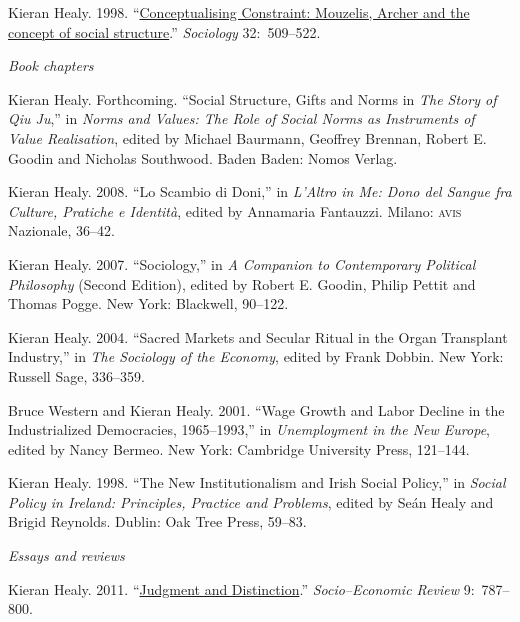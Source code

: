 \documentclass[11pt,oneside,a4paper,DIV=8]{scrartcl}
\begin{document}
Kieran Healy. 1998.  ``\href{http://www.kieranhealy.org/files/papers/constraint98.pdf}{Conceptualising Constraint: Mouzelis, Archer and the concept of
  social structure}.'' \emph{Sociology} 32:~509--522. 



\noindent\emph{Book chapters}

Kieran Healy. Forthcoming. ``Social Structure, Gifts and Norms in \emph{The Story of Qiu Ju},'' in \emph{Norms and Values: The Role of Social Norms as Instruments of Value Realisation}, edited by Michael Baurmann, Geoffrey Brennan, Robert E. Goodin and Nicholas Southwood. Baden Baden: Nomos Verlag.

Kieran Healy. 2008. ``Lo Scambio di Doni,'' in \emph{L'Altro in Me: Dono del Sangue fra Culture, Pratiche e Identità}, edited by Annamaria Fantauzzi. Milano: \textsc{avis} Nazionale, 36--42. 

Kieran Healy. 2007. ``Sociology,'' in \emph{A Companion to Contemporary Political Philosophy} (Second Edition), edited by Robert E. Goodin, Philip Pettit and Thomas Pogge. New York: Blackwell, 90--122. 

Kieran Healy. 2004. ``Sacred Markets and Secular Ritual in the Organ Transplant
Industry,'' in \emph{The Sociology of the Economy}, edited by Frank Dobbin. New
York: Russell Sage, 336--359.

Bruce Western and Kieran Healy.  2001.  ``Wage Growth and Labor Decline in the
Industrialized Democracies, 1965--1993,'' in \emph{Unemployment in the New
  Europe}, edited by Nancy Bermeo. New York: Cambridge University Press,
121--144.

 Kieran Healy. 1998. ``The New Institutionalism and Irish Social Policy,'' in
\emph{Social Policy in Ireland: Principles, Practice and Problems}, edited by
Se\'{a}n Healy and Brigid Reynolds. Dublin: Oak Tree Press, 59--83.



 

\noindent\emph{Essays and reviews}


Kieran Healy. 2011. ``\href{http://www.kieranhealy.org/files/reviews/karpik-review.pdf}{Judgment and Distinction}.'' \emph{Socio--Economic Review} 9:~787--800. 
\end{document}
